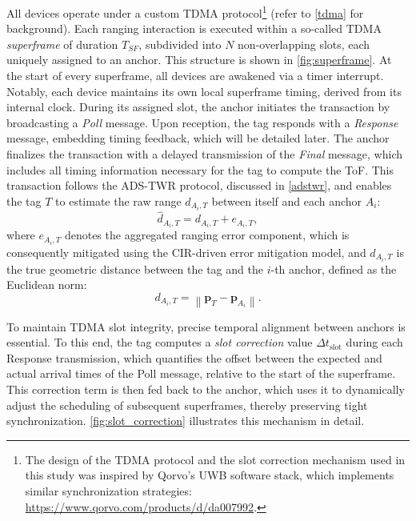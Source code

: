 All devices operate under a custom TDMA protocol\footnote{The design of the TDMA protocol and the slot correction mechanism used in this study was inspired by Qorvo's UWB software stack, which implements similar synchronization strategies: \url{https://www.qorvo.com/products/d/da007992}.} (refer to \autoref{tdma} for background). Each ranging interaction is executed within a so-called TDMA \emph{superframe} of duration $T_{SF}$, subdivided into $N$ non-overlapping slots, each uniquely assigned to an anchor. This structure is shown in \autoref{fig:superframe}. At the start of every superframe, all devices are awakened via a timer interrupt. Notably, each device maintains its own local superframe timing, derived from its internal clock. During its assigned slot, the anchor initiates the transaction by broadcasting a \emph{Poll} message. Upon reception, the tag responds with a \emph{Response} message, embedding timing feedback, which will be detailed later. The anchor finalizes the transaction with a delayed transmission of the \emph{Final} message, which includes all timing information necessary for the tag to compute the ToF. This transaction follows the ADS-TWR protocol, discussed in \autoref{adstwr}, and enables the tag $T$ to estimate the raw range $\hat{d}_{A_i,T}$ between itself and each anchor $A_i$:
\begin{equation}
\hat{d}_{A_i,T} = d_{A_i,T} + e_{A_i,T},\label{eq:raw_range}
\end{equation}
where $e_{A_i,T}$ denotes the aggregated ranging error component, which is consequently mitigated using the CIR-driven error mitigation model, and $d_{A_i,T}$ is the true geometric distance between the tag and the $i$-th anchor, defined as the Euclidean norm:
\begin{equation} 
d_{A_i,T} = \left\| \mathbf{p}_T - \mathbf{p}_{A_i} \right\|.\label{eq:true_distance} 
\end{equation}

To maintain TDMA slot integrity, precise temporal alignment between anchors is essential. To this end, the tag computes a \textit{slot correction} value $\Delta t_{\text{slot}}$ during each Response transmission, which quantifies the offset between the expected and actual arrival times of the Poll message, relative to the start of the superframe. This correction term is then fed back to the anchor, which uses it to dynamically adjust the scheduling of subsequent superframes, thereby preserving tight synchronization. \autoref{fig:slot_correction} illustrates this mechanism in detail.

